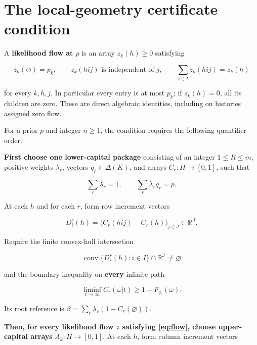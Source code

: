 \documentclass[11pt,a4paper]{article}
\begin{document}
\clearpage
\section{The local-geometry certificate condition}

A \textbf{likelihood flow at \(p\)} is an array \(z_k(h)\ge0\) satisfying

\begin{equation}
z_k(\varnothing)=p_k,\qquad
z_k(hij)\text{ is independent of }j,\qquad
\sum_{i\in I}z_k(hij)=z_k(h)
\label{eq:flow}
\end{equation}

for every \(k,h,j\). In particular every entry is at most \(p_k\); if \(z_k(h)=0\), all its children are zero. These are direct algebraic identities, including on histories assigned zero flow.

For a prior \(p\) and integer \(n\ge1\), the condition requires the following quantifier order.

\textbf{First choose one lower-capital package} consisting of an integer \(1\le R\le m\), positive weights \(\lambda_r\), vectors \(q_r\in\Delta(K)\), and arrays \(C_r:H\to[0,1]\), such that

\begin{equation}
\sum_r\lambda_r=1,\qquad \sum_r\lambda_rq_r=p. \label{eq:split}
\end{equation}

At each \(h\) and for each \(r\), form row increment vectors

\[
D^r_i(h)=\big(C_r(hij)-C_r(h)\big)_{j\in J}\in\mathbb R^J.
\]

Require the finite convex-hull intersection

\begin{equation}
\operatorname{conv}\{D^r_i(h):i\in I\}
 \cap\mathbb R_-^J\ne\varnothing \label{eq:lower_hull}
\end{equation}

and the boundary inequality on \textbf{every} infinite path

\begin{equation}
\liminf_{t\to\infty}C_r(\omega|t)\ge1-F_{q_r}(\omega).
\label{eq:lower_boundary}
\end{equation}

Its root reference is \(\beta=\sum_r\lambda_r(1-C_r(\varnothing))\).

\textbf{Then, for every likelihood flow \(z\) satisfying \eqref{eq:flow}, choose upper-capital arrays} \(A_k:H\to[0,1]\). At each \(h\), form column increment vectors
\end{document}
